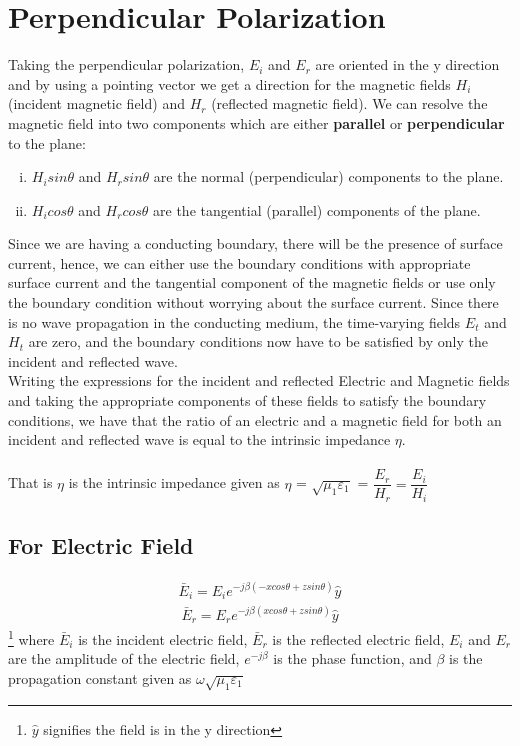 \section{Perpendicular Polarization}
Taking the perpendicular polarization, $E_i$ and $E_r$ are oriented in the y direction and by using a pointing vector we get a direction for the magnetic fields $H_i$ (incident magnetic field) and $H_r$ (reflected magnetic field). We can resolve the magnetic field into two
components which are either \textbf{parallel} or \textbf{perpendicular} to the plane:
\begin{enumerate}[(i)]
\item $ H_isin\theta $ and $ H_rsin\theta $  are the normal (perpendicular) components to the plane.
\item $ H_icos\theta $ and $ H_rcos\theta $ are the tangential (parallel) components of the plane.
\end{enumerate}
Since we are having a conducting boundary, there will be the presence of surface current, hence, we can either use the boundary conditions with appropriate surface current and the tangential component of the magnetic fields or use only the boundary condition without worrying about the surface current. Since there is no wave propagation in the conducting medium, the time-varying fields $E_t$ and $H_t$ are zero, and the boundary conditions now have to be satisfied by only the incident and reflected wave.\\ 
Writing the expressions for the incident and reflected Electric and Magnetic fields and taking the appropriate components of these fields
to satisfy the boundary conditions, we have that the ratio of an electric and a magnetic field for both an incident and reflected wave is equal to the intrinsic impedance $\eta $.\\\\ 
That is $ \eta $ is the intrinsic impedance given as $\eta $ = $\sqrt{\mu_1 \varepsilon_1 }$ = $\dfrac{E_r}{H_r} = \dfrac{E_i}{H_i}$
\subsection{For Electric Field}
\begin{align}
\bar{E}_i = E_i e^{-j\beta(-xcos\theta + zsin\theta)} \hat{y}
\label{eqn:elecincid}
\end{align}
\begin{align}
\bar{E}_r =E_r  e^{-j\beta ( xcos\theta + zsin\theta)} \hat{y}
\label{eqn:elecref}
\end{align}\footnote{$\hat{y}$ signifies the field is in the y direction}
where $\bar{E}_i$ is the incident electric field, $\bar{E}_r$ is the reflected electric field, $E_i$ and $E_r$ are the amplitude of the electric field, $e^{-j\beta}$ is the phase function, and $\beta$ is the propagation constant given as $\omega \sqrt{\mu_1\varepsilon_1}$ 

